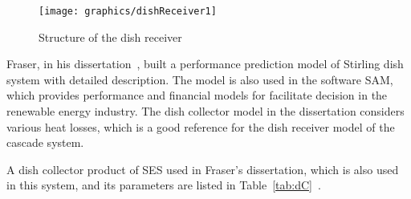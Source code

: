 \documentclass{article}
\begin{document}
\noindent \begin{figure}[htbp]
\begin{center}
	\texttt{[image: graphics/dishReceiver1]}
	\caption{Structure of the dish receiver}
	\label{fig:dishReceiver}
\end{center}
\end{figure}

Fraser, in his dissertation~\cite{Fraser2008}, built a performance prediction model of Stirling dish system with detailed description. The model is also used in the software SAM, which provides performance and financial models for facilitate decision in the renewable energy industry. The dish collector model in the dissertation considers various heat losses, which is a good reference for the dish receiver model of the cascade system. 

A dish collector product of SES used in Fraser's dissertation, which is also used in this system, and its parameters are listed in Table~\ref{tab:dC}~\cite{Fraser2008}. 
\end{document}
